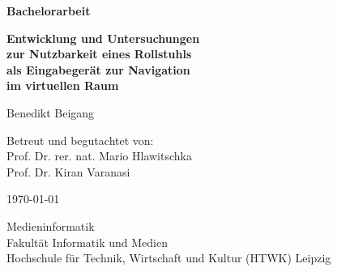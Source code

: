 \begin{titlepage}
    \begin{center}
        \vspace*{1cm}

        \textbf{\Huge{Bachelorarbeit}}

        \vspace{0.5cm}

        \textbf{\huge
            {
                Entwicklung und Untersuchungen\\
                zur Nutzbarkeit eines Rollstuhls\\
                als Eingabegerät zur Navigation\\
                im virtuellen Raum\\
            }}

        \vspace{1.5cm}

        \LARGE{Benedikt Beigang}

        \vfill

        \large
        {
            Betreut und begutachtet von:\\
            Prof. Dr. rer. nat. Mario Hlawitschka\\
            Prof. Dr. Kiran Varanasi
        }

        \vspace{2.5cm}

        \today

        \vspace{0.5cm}

        \large{
            Medieninformatik\\
            Fakultät Informatik und Medien\\
            Hochschule für Technik, Wirtschaft und Kultur (HTWK) Leipzig
        }

    \end{center}
\end{titlepage}